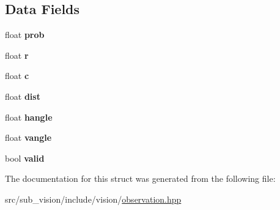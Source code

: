 \subsection*{Data Fields}
\begin{DoxyCompactItemize}
\item 
\mbox{\label{structObservation_aa082aa823d44be5463acce9b91a62d67}} 
float {\bfseries prob}
\item 
\mbox{\label{structObservation_ad4a17f66011cb1acb59c676dea2f56e9}} 
float {\bfseries r}
\item 
\mbox{\label{structObservation_a10c9b97bf011888e9a8f2b9272cd61a3}} 
float {\bfseries c}
\item 
\mbox{\label{structObservation_a3bd32b0302dc9a660dc84e4d137e220f}} 
float {\bfseries dist}
\item 
\mbox{\label{structObservation_ad33beb745efb83577dc6dbba6c313354}} 
float {\bfseries hangle}
\item 
\mbox{\label{structObservation_a05efd2f1b85de404cdebb84e329834ca}} 
float {\bfseries vangle}
\item 
\mbox{\label{structObservation_a5a107725f208f0adcae5fcbb93126ab4}} 
bool {\bfseries valid}
\end{DoxyCompactItemize}


The documentation for this struct was generated from the following file\+:\begin{DoxyCompactItemize}
\item 
src/sub\+\_\+vision/include/vision/\hyperlink{observation_8hpp}{observation.\+hpp}\end{DoxyCompactItemize}
